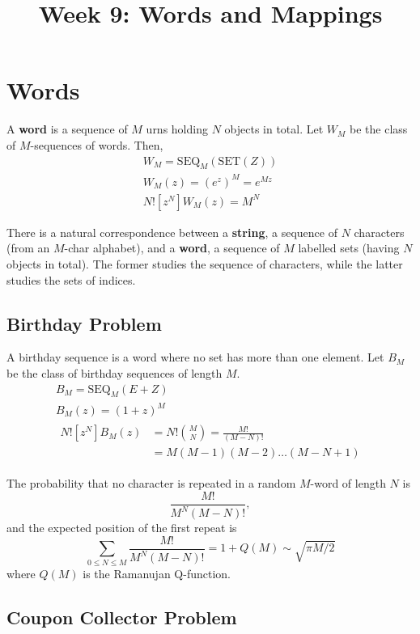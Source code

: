 \documentclass{article}
\begin{document}
\title{Week 9: Words and Mappings}
\maketitle

\section{Words}

A \textbf{word} is a sequence of $M$ urns holding $N$ objects in total. Let
$W_M$ be the class of $M$-sequences of words. Then,
\begin{gather*}
  W_M = \mathrm{SEQ}_M(\mathrm{SET}(Z)) \\
  W_M(z) = (e^z)^M = e^{Mz} \\
  N![z^N]W_M(z) = M^N
\end{gather*}

There is a natural correspondence between a \textbf{string}, a sequence of $N$
characters (from an $M$-char alphabet), and a \textbf{word}, a sequence of $M$
labelled sets (having $N$ objects in total). The former studies the sequence
of characters, while the latter studies the sets of indices.

\subsection{Birthday Problem}

A birthday sequence is a word where no set has more than one element. Let $B_M$
be the class of birthday sequences of length $M$.
\begin{gather*}
  B_M = \mathrm{SEQ}_M(E + Z) \\
  B_M(z) = (1 + z)^M \\
  \begin{aligned}
    N![z^N]B_M(z)
    &= N!\binom{M}{N} = \frac{M!}{(M - N)!} \\
    &= M(M - 1)(M - 2)\ldots(M - N + 1)
  \end{aligned}
\end{gather*}

The probability that no character is repeated in a random $M$-word of length
$N$ is \[
  \frac{M!}{M^N(M - N)!},
\] and the expected position of the first repeat is \[
  \sum_{0 \leq N \leq M} \frac{M!}{M^N(M - N)!} = 1 + Q(M) \sim \sqrt{\pi M/2}
\] where $Q(M)$ is the Ramanujan Q-function.

\subsection{Coupon Collector Problem}
\end{document}
